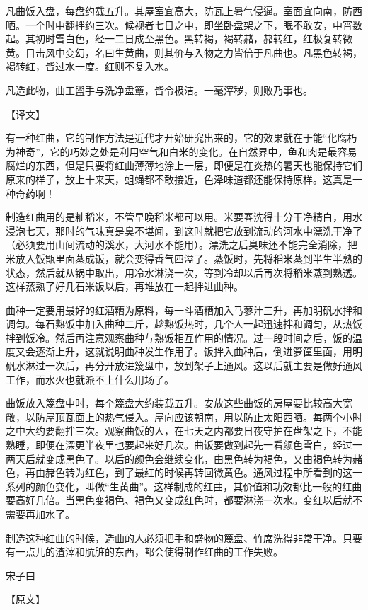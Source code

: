 \documentclass[12pt,UTF8]{ctexbook}
\begin{document}
凡曲饭入盘，每盘约载五升。其屋室宜高大，防瓦上暑气侵逼。室面宜向南，防西晒。一个时中翻拌约三次。候视者七日之中，即坐卧盘架之下，眠不敢安，中宵数起。其初时雪白色，经一二日成至黑色。黑转褐，褐转赭，赭转红，红极复转微黄。目击风中变幻，名曰生黄曲，则其价与入物之力皆倍于凡曲也。凡黑色转褐，褐转红，皆过水一度。红则不复入水。

凡造此物，曲工盥手与洗净盘簟，皆令极洁。一毫滓秽，则败乃事也。

【译文】

有一种红曲，它的制作方法是近代才开始研究出来的，它的效果就在于能“化腐朽为神奇”，它的巧妙之处是利用空气和白米的变化。在自然界中，鱼和肉是最容易腐烂的东西，但是只要将红曲薄薄地涂上一层，即便是在炎热的暑天也能保持它们原来的样子，放上十来天，蛆蝇都不敢接近，色泽味道都还能保持原样。这真是一种奇药啊！

制造红曲用的是籼稻米，不管早晚稻米都可以用。米要舂洗得十分干净精白，用水浸泡七天，那时的气味真是臭不堪闻，到这时就把它放到流动的河水中漂洗干净了（必须要用山间流动的溪水，大河水不能用）。漂洗之后臭味还不能完全消除，把米放入饭甑里面蒸成饭，就会变得香气四溢了。蒸饭时，先将稻米蒸到半生半熟的状态，然后就从锅中取出，用冷水淋浇一次，等到冷却以后再次将稻米蒸到熟透。这样蒸熟了好几石米饭以后，再堆放在一起拌进曲种。

曲种一定要用最好的红酒糟为原料，每一斗酒糟加入马蓼汁三升，再加明矾水拌和调匀。每石熟饭中加入曲种二斤，趁熟饭热时，几个人一起迅速拌和调匀，从热饭拌到饭冷。然后再注意观察曲种与熟饭相互作用的情况。过一段时间之后，饭的温度又会逐渐上升，这就说明曲种发生作用了。饭拌入曲种后，倒进箩筐里面，用明矾水淋过一次后，再分开放进篾盘中，放到架子上通风。这以后就主要是做好通风工作，而水火也就派不上什么用场了。

曲饭放入篾盘中时，每个篾盘大约装载五升。安放这些曲饭的房屋要比较高大宽敞，以防屋顶瓦面上的热气侵入。屋向应该朝南，用以防止太阳西晒。每两个小时之中大约要翻拌三次。观察曲饭的人，在七天之内都要日夜守护在盘架之下，不能熟睡，即便在深更半夜里也要起来好几次。曲饭要做到起先一看颜色雪白，经过一两天后就变成黑色了。以后的颜色会继续变化，由黑色转为褐色，又由褐色转为赭色，再由赭色转为红色，到了最红的时候再转回微黄色。通风过程中所看到的这一系列的颜色变化，叫做“生黄曲”。这样制成的红曲，其价值和功效都比一般的红曲要高好几倍。当黑色变褐色、褐色又变成红色时，都要淋浇一次水。变红以后就不需要再加水了。

制造这种红曲的时候，造曲的人必须把手和盛物的篾盘、竹席洗得非常干净。只要有一点儿的渣滓和肮脏的东西，都会使得制作红曲的工作失败。

宋子曰

【原文】
\end{document}

